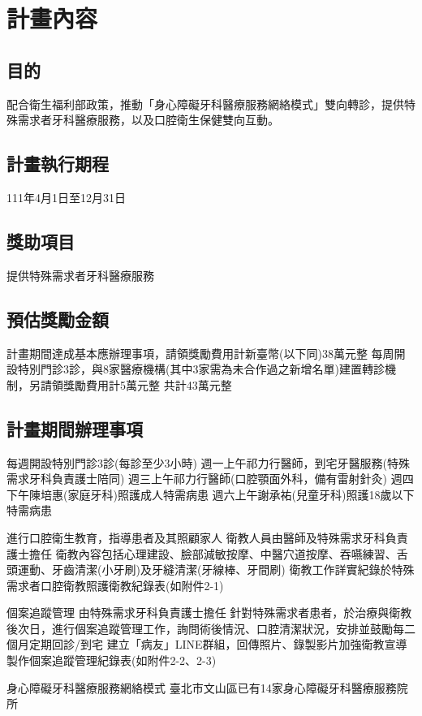 \section{計畫內容}

\subsection{目的}
配合衛生福利部政策，推動「身心障礙牙科醫療服務網絡模式」雙向轉診，提供特殊需求者牙科醫療服務，以及口腔衛生保健雙向互動。


\subsection{計畫執行期程}
111年4月1日至12月31日

\subsection{獎助項目}
提供特殊需求者牙科醫療服務

\subsection{預估獎勵金額}
\begin{outline}
\1 計畫期間達成基本應辦理事項，請領獎勵費用計新臺幣(以下同)38萬元整
\1 每周開設特別門診3診，與8家醫療機構(其中3家需為未合作過之新增名單)建置轉診機制，另請領獎勵費用計5萬元整
\1 共計43萬元整
\end{outline}

\subsection{計畫期間辦理事項}

\begin{outline}
\1 每週開設特別門診3診(每診至少3小時)
    \2 週一上午祁力行醫師，到宅牙醫服務(特殊需求牙科負責護士陪同)
    \2 週三上午祁力行醫師(口腔顎面外科，備有雷射針灸)
    \2 週四下午陳培惠(家庭牙科)照護成人特需病患
    \2 週六上午謝承祐(兒童牙科)照護18歲以下特需病患
    
\1 進行口腔衛生教育，指導患者及其照顧家人
    \2 衛教人員由醫師及特殊需求牙科負責護士擔任
    \2 衛教內容包括心理建設、臉部減敏按摩、中醫穴道按摩、吞嚥練習、舌頭運動、牙齒清潔(小牙刷)及牙縫清潔(牙線棒、牙間刷)
    \2 衛教工作詳實紀錄於特殊需求者口腔衛教照護衛教紀錄表(如附件2-1)
    
\1 個案追蹤管理
    \2 由特殊需求牙科負責護士擔任
    \2 針對特殊需求者患者，於治療與衛教後次日，進行個案追蹤管理工作，詢問術後情況、口腔清潔狀況，安排並鼓勵每二個月定期回診/到宅
    \2 建立「病友」LINE群組，回傳照片、錄製影片加強衛教宣導
    \2 製作個案追蹤管理紀錄表(如附件2-2、2-3)

\1 身心障礙牙科醫療服務網絡模式
    \2 臺北市文山區已有14家身心障礙牙科醫療服務院所
 
\end{outline}

